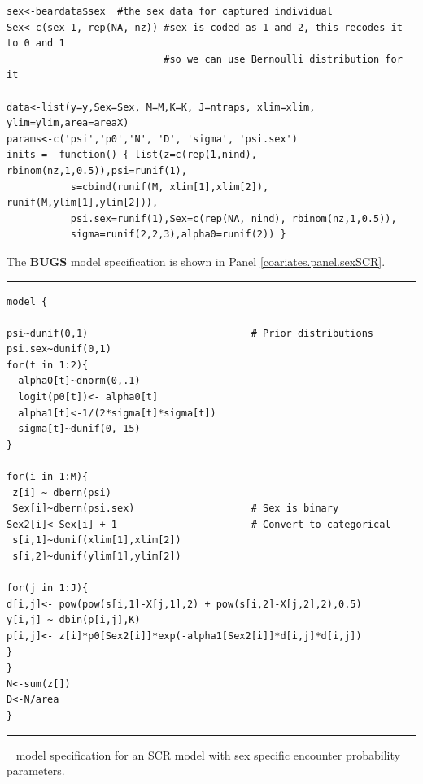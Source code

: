 {\small
\begin{verbatim}
sex<-beardata$sex  #the sex data for captured individual
Sex<-c(sex-1, rep(NA, nz)) #sex is coded as 1 and 2, this recodes it to 0 and 1
                           #so we can use Bernoulli distribution for it

data<-list(y=y,Sex=Sex, M=M,K=K, J=ntraps, xlim=xlim, ylim=ylim,area=areaX)
params<-c('psi','p0','N', 'D', 'sigma', 'psi.sex')
inits =  function() { list(z=c(rep(1,nind), rbinom(nz,1,0.5)),psi=runif(1), 
           s=cbind(runif(M, xlim[1],xlim[2]), runif(M,ylim[1],ylim[2])),
           psi.sex=runif(1),Sex=c(rep(NA, nind), rbinom(nz,1,0.5)), 
           sigma=runif(2,2,3),alpha0=runif(2)) }
\end{verbatim}
}
{\flushleft The} {\bf BUGS} model specification is shown in Panel 
\ref{coariates.panel.sexSCR}.

\begin{panel}[htp]
\centering
\rule[0.1in]{\textwidth}{.03in}
{\small
\begin{verbatim}
model {

psi~dunif(0,1)                            # Prior distributions
psi.sex~dunif(0,1)
for(t in 1:2){                             
  alpha0[t]~dnorm(0,.1)
  logit(p0[t])<- alpha0[t]
  alpha1[t]<-1/(2*sigma[t]*sigma[t])
  sigma[t]~dunif(0, 15)
}

for(i in 1:M){
 z[i] ~ dbern(psi)
 Sex[i]~dbern(psi.sex)                    # Sex is binary
Sex2[i]<-Sex[i] + 1                       # Convert to categorical
 s[i,1]~dunif(xlim[1],xlim[2])
 s[i,2]~dunif(ylim[1],ylim[2])

for(j in 1:J){
d[i,j]<- pow(pow(s[i,1]-X[j,1],2) + pow(s[i,2]-X[j,2],2),0.5)
y[i,j] ~ dbin(p[i,j],K)
p[i,j]<- z[i]*p0[Sex2[i]]*exp(-alpha1[Sex2[i]]*d[i,j]*d[i,j])
}
}
N<-sum(z[])
D<-N/area
}
\end{verbatim}
}

\rule[-0.1in]{\textwidth}{.03in}
\caption{
\jags~ model specification for an SCR model with sex specific 
encounter probability parameters.}
\label{covariates.panel.sexSCR}
\end{panel}

